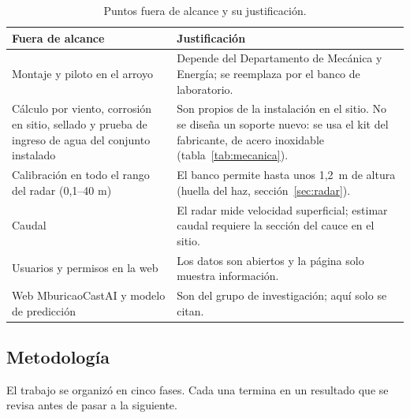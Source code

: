 \documentclass[11pt,a4paper]{article}
\begin{document}
\begin{table}[H]
    \centering
    \small
    \caption{Puntos fuera de alcance y su justificación.}
    \begin{tabularx}{\textwidth}{>{\raggedright\arraybackslash}p{5.4cm}L}
        \toprule
        \textbf{Fuera de alcance} & \textbf{Justificación} \\
        \midrule
        Montaje y piloto en el arroyo & Depende del Departamento de Mecánica y
            Energía; se reemplaza por el banco de laboratorio. \\
        Cálculo por viento, corrosión en sitio, sellado y prueba de ingreso de
            agua del conjunto instalado & Son propios de la instalación en el
            sitio. No se diseña un soporte nuevo: se usa el kit del fabricante,
            de acero inoxidable (tabla~\ref{tab:mecanica}). \\
        Calibración en todo el rango del radar (0,1--40 m) & El banco permite
            hasta unos 1,2~m de altura (huella del haz,
            sección~\ref{sec:radar}). \\
        Caudal & El radar mide velocidad superficial; estimar caudal requiere
            la sección del cauce en el sitio. \\
        Usuarios y permisos en la web & Los datos son abiertos y la página solo
            muestra información. \\
        Web MburicaoCastAI y modelo de predicción & Son del grupo de
            investigación; aquí solo se citan. \\
        \bottomrule
    \end{tabularx}
\end{table}

\subsection{Metodología}
\label{sec:metodologia}

El trabajo se organizó en cinco fases. Cada una termina en un resultado que se
revisa antes de pasar a la siguiente.
\end{document}
